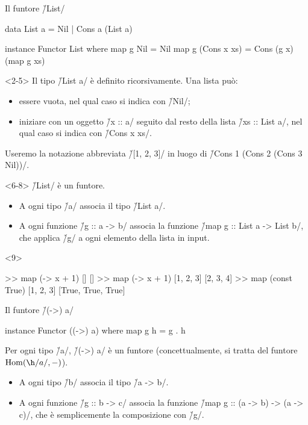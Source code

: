 \begin{frame}[fragile]{\secname}{Il funtore \h/List/}
\begin{overlayarea}{\textwidth}{0.7\textheight}
\begin{haskellcode}
data List a = Nil | Cons a (List a)

instance Functor List where
    map g Nil = Nil
    map g (Cons x xs) = Cons (g x) (map g xs)
\end{haskellcode}

\begin{onlyenv}<2-5>
Il tipo \h/List a/ è definito ricorsivamente. Una lista può:
\pause
\begin{itemize}[<+(1)->]
\item essere vuota, nel qual caso si indica con \h/Nil/;
\item iniziare con un oggetto \h/x :: a/ seguito dal resto della lista \h/xs :: List a/, nel qual caso si indica con \h/Cons x xs/.
\end{itemize}
\pause
Useremo la notazione abbreviata \h/[1, 2, 3]/ in luogo di
\h/Cons 1 (Cons 2 (Cons 3 Nil))/.
\end{onlyenv}

\begin{onlyenv}<6-8>
\h/List/ è un funtore.
\pause
\begin{itemize}[<+(1)->]
\item A ogni tipo \h/a/ associa il tipo \h/List a/.
\item A ogni funzione \h/g :: a -> b/ associa la funzione \h/map g :: List a -> List b/, che applica \h/g/ a ogni elemento della lista in input.
\end{itemize}
\end{onlyenv}

\begin{onlyenv}<9>
\begin{runhaskell}
>>  map (\x -> x + 1) []
    []
>>  map (\x -> x + 1) [1, 2, 3]
    [2, 3, 4]
>>  map (const True) [1, 2, 3]
    [True, True, True]
\end{runhaskell}
\end{onlyenv}
\end{overlayarea}
\end{frame}

\begin{frame}[fragile]{\secname}{Il funtore \h/(->) a/}
\begin{haskellcode}
instance Functor ((->) a) where
    map g h = g . h
\end{haskellcode}
\pause

Per ogni tipo \h/a/, \h/(->) a/ è un funtore (concettualmente, si tratta del funtore $\Hom(\h/a/,-)$).
\begin{itemize}[<+(1)->]
\item A ogni tipo \h/b/ associa il tipo \h/a -> b/.
\item A ogni funzione \h/g :: b -> c/ associa la funzione \h/map g :: (a -> b) -> (a -> c)/, che è semplicemente la composizione con \h/g/.
\end{itemize}
\end{frame}

